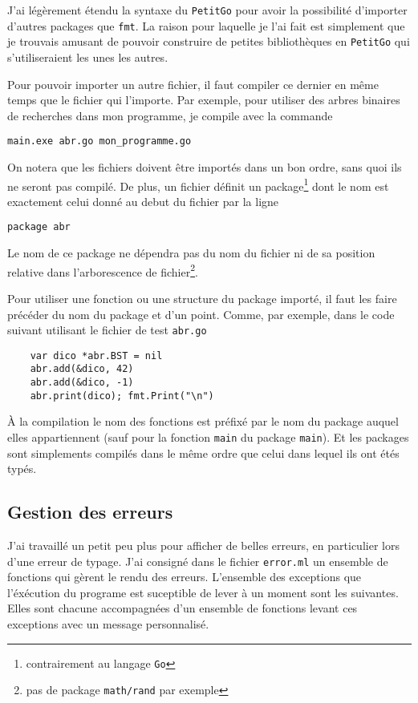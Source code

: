 \documentclass[11pt]{article}
\begin{document}
J'ai légèrement étendu la syntaxe du \texttt{PetitGo} pour avoir la possibilité d'importer d'autres packages que \texttt{fmt}. La raison pour laquelle je l'ai fait est simplement que je trouvais amusant de pouvoir construire de petites bibliothèques en \texttt{PetitGo} qui s'utiliseraient les unes les autres.

Pour pouvoir importer un autre fichier, il faut compiler ce dernier en même temps que le fichier qui l'importe. Par exemple, pour utiliser des arbres binaires de recherches dans mon programme, je compile avec la commande

\begin{verbatim}
main.exe abr.go mon_programme.go
\end{verbatim}

On notera que les fichiers doivent être importés dans un bon ordre, sans quoi ils ne seront pas compilé. De plus, un fichier définit un package\footnote{contrairement au langage \texttt{Go}} dont le nom est exactement celui donné au debut du fichier par la ligne

\begin{verbatim}
package abr
\end{verbatim}

Le nom de ce package ne dépendra pas du nom du fichier ni de sa position relative dans l'arborescence de fichier\footnote{pas de package \texttt{math/rand} par exemple}.

Pour utiliser une fonction ou une structure du package importé, il faut les faire précéder du nom du package et d'un point. Comme, par exemple, dans le code suivant utilisant le fichier de test \texttt{abr.go}

\begin{verbatim}
    var dico *abr.BST = nil
    abr.add(&dico, 42)
    abr.add(&dico, -1)
    abr.print(dico); fmt.Print("\n")
\end{verbatim}

À la compilation le nom des fonctions est préfixé par le nom du package auquel elles appartiennent (sauf pour la fonction \texttt{main} du package \texttt{main}). Et les packages sont simplements compilés dans le même ordre que celui dans lequel ils ont étés typés.

\subsection{Gestion des erreurs\label{sec:errors}}

J'ai travaillé un petit peu plus pour afficher de belles erreurs, en particulier lors d'une erreur de typage. J'ai consigné dans le fichier \texttt{error.ml} un ensemble de fonctions qui gèrent le rendu des erreurs. L'ensemble des exceptions que l'éxécution du programe est suceptible de lever à un moment sont les suivantes. Elles sont chacune accompagnées d'un ensemble de fonctions levant ces exceptions avec un message personnalisé.
\end{document}
